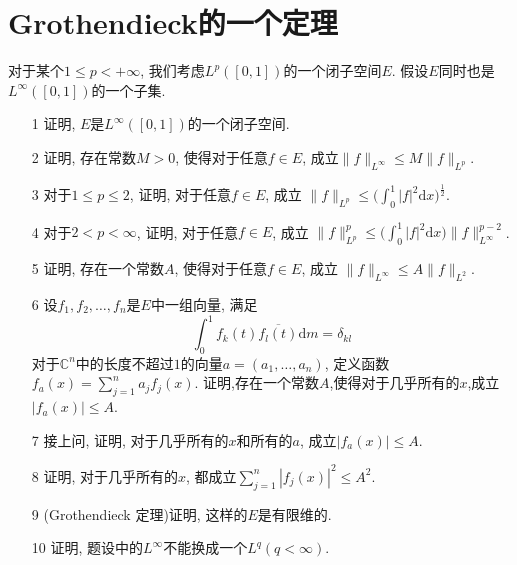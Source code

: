 \section*{Grothendieck的一个定理}
\quad 对于某个$1 \leqslant p < +\infty$, 我们考虑$L^p([0, 1])$的一个闭子空间$E$. 
假设$E$同时也是$L^{\infty}([0, 1])$的一个子集.
\begin{itemize}
    \item[1]证明, $E$是$L^\infty([0, 1])$的一个闭子空间.
    \item[2]证明, 存在常数$M >0$, 使得对于任意$f \in E$, 
    成立$\|f\|_{L^\infty}\leqslant M \|f\|_{L^p}$.
    \item[3]对于$1\leqslant p \leqslant 2$, 证明, 对于任意$f \in E$, 成立
    $\displaystyle \|f\|_{L^p}\leqslant \bigg(\int_{0}^{1}|f|^2\mathrm{d}x\bigg)^\frac{1}{2}$.
    \item[4]对于$2<p<\infty$, 证明, 对于任意$f \in E$, 成立
    $\displaystyle \|f\|_{L^p}^p \leqslant \bigg(\int_{0}^{1}|f|^2\text{d}x\bigg)\|f\|_{L^\infty}^{p-2}$.
    \item[5]证明, 存在一个常数$A$, 使得对于任意$f \in E$, 成立
    $\|f\|_{L^\infty} \leqslant A\|f\|_{L^2}$.
    \item[6]设$f_1,f_2, \dots, f_n$是$E$中一组向量, 满足
    $$\int_{0}^{1}f_k(t)\overline{f_l(t)}\mathrm{d}m=\delta_{kl}$$
    对于$\mathbb{C}^n$中的长度不超过$1$的向量$a=(a_1, \dots , a_n)$, 
    定义函数$\displaystyle f_a(x)=\sum_{j=1}^{n}a_jf_j(x)$. 
    证明,存在一个常数$A$,使得对于几乎所有的$x$,成立$|f_a(x)|\leqslant A$.
    \item[7]接上问, 证明, 对于几乎所有的$x$和所有的$a$, 成立$|f_a(x)| \leqslant A$.
    \item[8]证明, 对于几乎所有的$x$, 都成立$\displaystyle \sum_{j=1}^{n}|f_j(x)|^2 \leqslant A^2$.
    \item[9](Grothendieck 定理)证明, 这样的$E$是有限维的.
    \item[10]证明, 题设中的$L^\infty$不能换成一个$L^q(q < \infty)$.
\end{itemize}